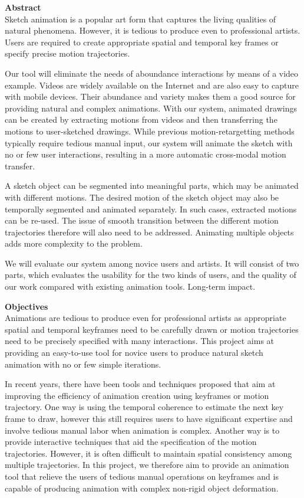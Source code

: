\textbf{Abstract}\\
Sketch animation is a popular art form that captures the living qualities of natural
phenomena. However, it is tedious to produce even to professional artists. Users are required to create 
appropriate spatial and temporal key frames or specify precise motion trajectories.

Our tool will eliminate the needs of aboundance interactions by means of a video example.
Videos are widely available on the Internet and are also easy to capture with mobile devices. 
Their abundance and variety makes them a good source for providing natural and complex animations.
With our system, animated drawings can be created by 
extracting motions from videos and then transferring the motions to user-sketched drawings.
While previous motion-retargetting methods typically require tedious manual input, our system will
animate the sketch with no or few user interactions, 
resulting in a more automatic cross-modal motion transfer.

A sketch object can be segmented into meaningful parts, which may be animated with different motions. 
The desired motion of the sketch object may also be temporally segmented and animated separately.
In such cases, extracted motions can be re-used.
The issue of smooth transition between the different motion trajectories therefore will also need to 
be addressed.  Animating multiple objects adds more complexity to the problem.

We will evaluate our system among novice users and artists. 
It will consist of two parts, which evaluates the usability for the two kinds of users,
and the quality of our work compared with existing animation tools.
Long-term impact.

\textbf{Objectives}\\

Animations are tedious to produce even for professional artists as 
appropriate spatial and temporal keyframes need to be carefully drawn or 
motion trajectories need to be precisely specified with many interactions.
This project aims at providing an easy-to-use tool for novice users to 
produce natural sketch animation with no or few simple iterations. 

In recent years, there have been tools and techniques proposed that aim at improving the efficiency of 
animation creation using keyframes or motion trajectory. One way is using the temporal coherence to estimate the next 
key frame to draw, however this still requires users to have significant expertise and involve tedious
manual labor when animation is complex. Another way is to provide interactive techniques that aid the specification
of the motion trajectories. However, it is often difficult to maintain spatial consistency among multiple 
trajectories. In this project, we therefore aim to provide an animation tool that relieve the users of
tedious manual operations on keyframes and is capable of producing animation with complex non-rigid 
object deformation.

